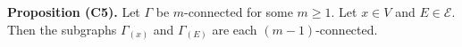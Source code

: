 \textbf{Proposition (C5).} Let $\Gamma$ be $m$-connected for some $m \geq 1$. Let $x \in V$ and $E \in \mathcal{E}$. Then the subgraphs $\Gamma_{(x)}$ and $\Gamma_{(E)}$ are each $(m - 1)$-connected.
